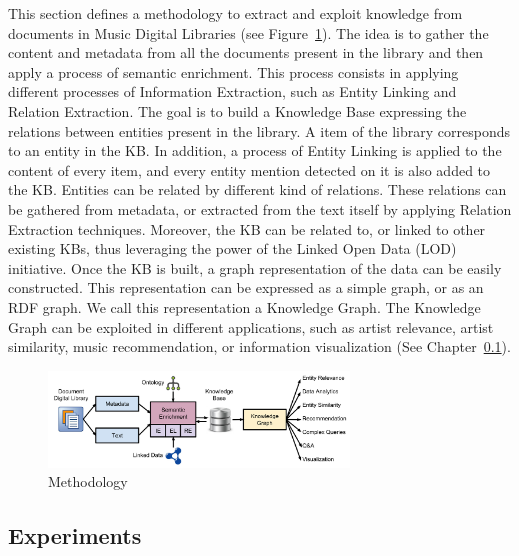 This section defines a methodology to extract and exploit knowledge from documents in Music Digital Libraries (see Figure~\ref{fig:musicology:methodology-dl}). The idea is to gather the content and metadata from all the documents present in the library and then apply a process of semantic enrichment. This process consists in applying different processes of Information Extraction, such as Entity Linking and Relation Extraction. The goal is to build a Knowledge Base expressing the relations between entities present in the library. %
A item of the library corresponds to an entity in the KB. In addition, a process of Entity Linking is applied to the content of every item, and every entity mention detected on it is also added to the KB. Entities can be related by different kind of relations. These relations can be gathered from metadata, or extracted from the text itself by applying Relation Extraction techniques. Moreover, the KB can be related to, or linked to other existing KBs, thus leveraging the power of the Linked Open Data (LOD) initiative. 
Once the KB is built, a graph representation of the data can be easily constructed. This representation can be expressed as a simple graph, or as an RDF graph. We call this representation a Knowledge Graph. The Knowledge Graph can be exploited in different applications, such as artist relevance, artist similarity, music recommendation, or information visualization (See Chapter~\ref{}).

\begin{figure}[!ht]
	\centering
	\includegraphics[width=8cm]{ch05_musicology/pics/methodology-dl.jpg}
	\caption{Methodology
	\label{fig:musicology:methodology-dl}}
\end{figure}

\subsection{Experiments}

